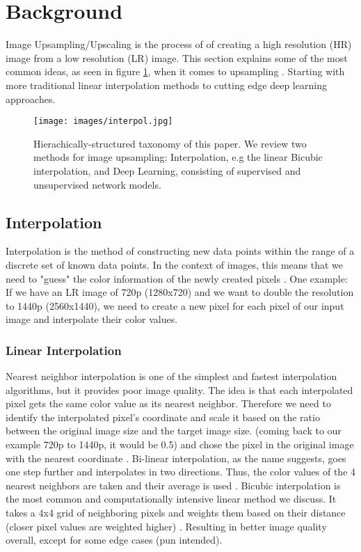 \documentclass[letterpaper, 10 pt, conference]{ieeeconf}  %
\begin{document}
\section{Background}
\label{Sec:RelatedWork}
Image Upsampling/Upscaling is the process of of creating a high resolution (HR) image from a low resolution (LR) image.
This section explains some of the most common ideas, as seen in figure \ref{fig:upsampling_methods}, when it comes to upsampling \cite{wang2022interpolation}\cite{wang2020deep}.
Starting with more traditional linear interpolation methods to cutting edge deep learning approaches. 

\begin{figure}[!ht]
        \caption{Hierachically-structured taxonomy of this paper.
        We review two methods for image upsampling: 
        Interpolation, e.g the linear Bicubic interpolation, and Deep Learning, consisting of supervised and unsupervised network models.}
        \centering
        \texttt{[image: images/interpol.jpg]}
        \label{fig:upsampling_methods}
    \end{figure}

\subsection{Interpolation}
\label{subsec:traditional}
Interpolation is the method of constructing new data points within the range of a discrete set of known data points.
In the context of images, this means that we need to "guess" the color information of the newly created pixels \cite{image_interpolation_def}.
One example: If we have an LR image of 720p (1280x720) and we want to double the resolution to 1440p (2560x1440), 
we need to create a new pixel for each pixel of our input image and interpolate their color values.

\subsubsection{Linear Interpolation}

Nearest neighbor interpolation is one of the simplest and fastest interpolation algorithms, but it provides poor image quality. 
The idea is that each interpolated pixel gets the same color value as its nearest neighbor. 
Therefore we need to identify the interpolated pixel's coordinate and scale it based on the ratio between the original image size and the target image size.
(coming back to our example 720p to 1440p, it would be 0.5) and chose the pixel in the original image with the nearest coordinate \cite{nearest_n}.
Bi-linear interpolation, as the name suggests, goes one step further and interpolates in two directions. 
Thus, the color values of the 4 nearest neighbors are taken and their average is used \cite{bilinear}.
Bicubic interpolation is the most common and computationally intensive linear method we discuss. 
It takes a 4x4 grid of neighboring pixels and weights them based on their distance (closer pixel values are weighted higher) \cite{bicubic}. 
Resulting in better image quality overall, except for some edge cases (pun intended).
\end{document}
